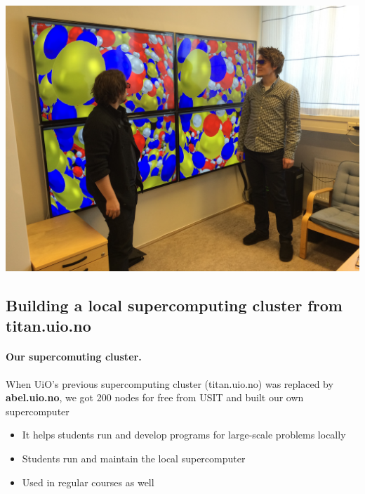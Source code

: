 \documentclass[%
twoside,                 %
final,                   %
10pt]{article}
\begin{document}
\noindent





\centerline{\includegraphics[width=1.0\linewidth]{fig-future/visualize.jpg}}






\subsection*{Building a local supercomputing cluster from titan.uio.no}

\paragraph{Our supercomuting cluster.}
When UiO's previous supercomputing cluster (titan.uio.no) was replaced by \textbf{abel.uio.no}, we got 200 nodes for free from USIT and built our own supercomputer
\begin{itemize}
\item It helps students run and develop programs for large-scale problems locally

\item Students run and maintain the local supercomputer

\item Used in regular courses as well
\end{itemize}

\noindent
\end{document}
